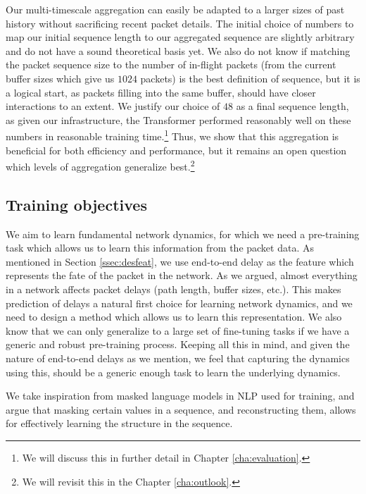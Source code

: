 Our multi-timescale aggregation can easily be adapted to a larger sizes of past history without sacrificing recent packet details. The initial choice of numbers to map our initial sequence length to our aggregated sequence are slightly arbitrary and do not have a sound theoretical basis yet. We also do not know if matching the packet sequence size to the number of in-flight packets (from the current buffer sizes which give us $1024$ packets) is the best definition of sequence, but it is a logical start, as packets filling into the same buffer, should have closer interactions to an extent. We justify our choice of $48$ as a final sequence length, as given our infrastructure, the Transformer performed reasonably well on these numbers in reasonable training time.\footnote{We will discuss this in further detail in Chapter \ref{cha:evaluation}.} Thus, we show that this aggregation is beneficial for both efficiency and performance, but it remains an open question which levels of aggregation generalize best.\footnote{We will revisit this in the Chapter \ref{cha:outlook}.}


\subsection{Training objectives}
\label{ssec:despatt}

We aim to learn fundamental network dynamics, for which we need a pre-training task which allows us to learn this information from the packet data. As mentioned in Section \ref{ssec:desfeat}, we use end-to-end delay as the feature which represents the fate of the packet in the network. As we argued, almost everything in a network affects packet delays (\eg path length, buffer sizes, etc.). This makes prediction of delays a natural first choice for learning network dynamics, and we need to design a method which allows us to learn this representation. We also know that we can only generalize to a large set of fine-tuning tasks if we have a generic and robust pre-training process. Keeping all this in mind, and given the nature of end-to-end delays as we mention, we feel that capturing the dynamics using this, should be a generic enough task to learn the underlying dynamics.


We take inspiration from masked language models\cite{closemask} in NLP used for training, and argue that masking certain values in a sequence, and reconstructing them, allows for effectively learning the structure in the sequence.

